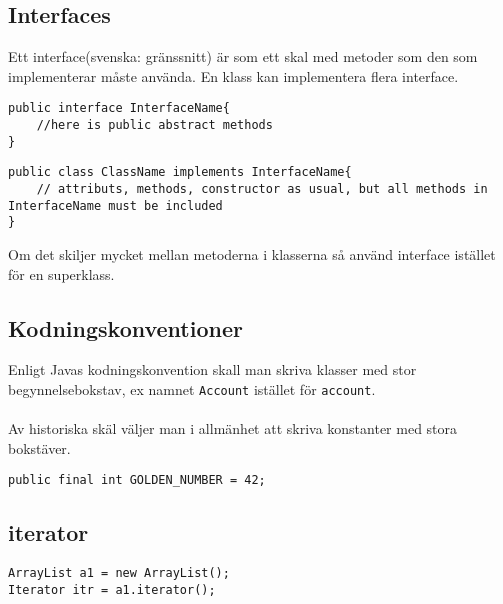 \documentclass[11pt]{article}
\begin{document}
\subsection{Interfaces}
Ett interface(svenska: gränssnitt) är som ett skal med metoder som den som implementerar måste använda. En klass kan implementera flera interface.
\begin{lstlisting}
public interface InterfaceName{
	//here is public abstract methods
}
\end{lstlisting}
\begin{lstlisting}
public class ClassName implements InterfaceName{
	// attributs, methods, constructor as usual, but all methods in InterfaceName must be included
}
\end{lstlisting}
Om det skiljer mycket mellan metoderna i klasserna så använd interface istället för en superklass.


\subsection{Kodningskonventioner}
Enligt Javas kodningskonvention skall man skriva klasser med stor begynnelsebokstav, ex namnet \verb+Account+ istället för \verb+account+. \\ \\
Av historiska skäl väljer man i allmänhet att skriva konstanter med stora bokstäver. 
\begin{lstlisting}
public final int GOLDEN_NUMBER = 42;
\end{lstlisting}

\subsection{iterator}
\begin{lstlisting}
ArrayList a1 = new ArrayList();
Iterator itr = a1.iterator();
\end{lstlisting}
\end{document}
